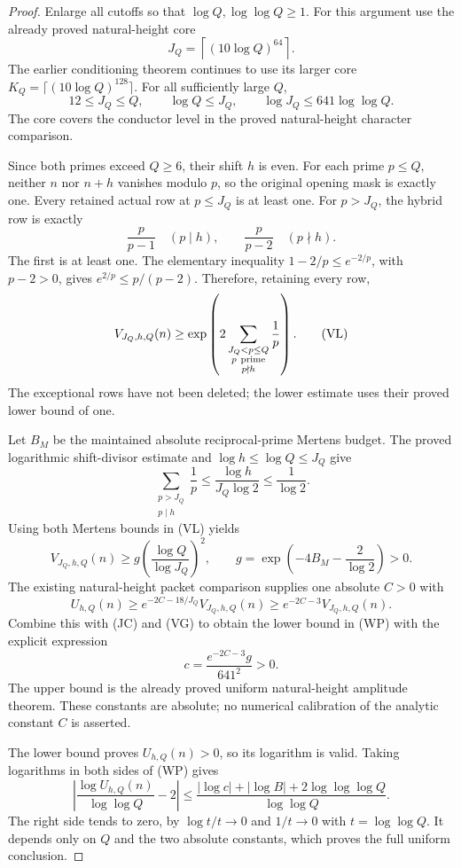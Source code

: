 \documentclass[11pt]{article}
\begin{document}
\begin{proof}
Enlarge all cutoffs so that \(\log Q,\log\log Q\geq1\).
For this argument use the already proved natural-height core
\[
 J_Q=\left\lceil(10\log Q)^{64}\right\rceil .
\]
The earlier conditioning theorem continues to use its larger core
\(K_Q=\lceil(10\log Q)^{128}\rceil\).
For all sufficiently large \(Q\),
\[
 12\leq J_Q\leq Q,\qquad
 \log Q\leq J_Q,\qquad
 \log J_Q\leq641\log\log Q .
 \tag{JC}
\]
The core covers the conductor level in the proved natural-height
character comparison.

Since both primes exceed \(Q\geq6\), their shift \(h\) is even.
For each prime \(p\leq Q\), neither \(n\) nor \(n+h\) vanishes
modulo \(p\), so the original opening mask is exactly one.
Every retained actual row at \(p\leq J_Q\) is at least one.
For \(p>J_Q\), the hybrid row is exactly
\[
 \frac p{p-1}\quad(p\mid h),\qquad
 \frac p{p-2}\quad(p\nmid h).
\]
The first is at least one. The elementary inequality
\(1-2/p\leq e^{-2/p}\), with \(p-2>0\), gives
\(e^{2/p}\leq p/(p-2)\). Therefore, retaining every row,
\[
 V_{J_Q,h,Q}(n)\geq
 \exp\left(2\sum_{\substack{J_Q<p\leq Q\\p\ {\rm prime}\\p\nmid h}}
                         \frac1p\right).
 \tag{VL}
\]
The exceptional rows have not been deleted; the lower estimate uses
their proved lower bound of one.

Let \(B_M\) be the maintained absolute reciprocal-prime Mertens
budget. The proved logarithmic shift-divisor estimate and
\(\log h\leq\log Q\leq J_Q\) give
\[
 \sum_{\substack{p>J_Q\\p\mid h}}\frac1p
 \leq\frac{\log h}{J_Q\log2}\leq\frac1{\log2}.
\]
Using both Mertens bounds in (VL) yields
\[
 V_{J_Q,h,Q}(n)\geq
 g\left(\frac{\log Q}{\log J_Q}\right)^2,\qquad
 g=\exp\left(-4B_M-\frac2{\log2}\right)>0.
 \tag{VG}
\]
The existing natural-height packet comparison supplies one absolute
\(C>0\) with
\[
 U_{h,Q}(n)\geq e^{-2C-18/J_Q}V_{J_Q,h,Q}(n)
              \geq e^{-2C-3}V_{J_Q,h,Q}(n).
\]
Combine this with (JC) and (VG) to obtain the lower bound in (WP)
with the explicit expression
\[
                       c=\frac{e^{-2C-3}g}{641^2}>0.
\]
The upper bound is the already proved uniform natural-height
amplitude theorem. These constants are absolute; no numerical
calibration of the analytic constant \(C\) is asserted.

The lower bound proves \(U_{h,Q}(n)>0\), so its logarithm is valid.
Taking logarithms in both sides of (WP) gives
\[
 \left|\frac{\log U_{h,Q}(n)}{\log\log Q}-2\right|
 \leq
 \frac{|\log c|+|\log B|+2\log\log\log Q}{\log\log Q}.
 \tag{WR}
\]
The right side tends to zero, by
\(\log t/t\to0\) and \(1/t\to0\) with \(t=\log\log Q\).
It depends only on \(Q\) and the two absolute constants, which
proves the full uniform conclusion.
\end{proof}
\end{document}
